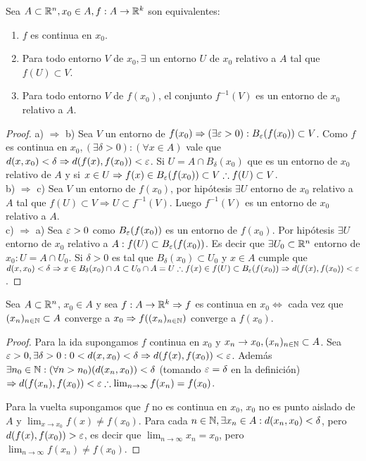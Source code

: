 \begin{prop}
  Sea $A \subset \mathbb{R}^n, x_0 \in A, f: A \to \mathbb{R}^k$ son equivalentes:
  \begin{enumerate}
    \item $f$ es continua en $x_0$.
    \item Para todo entorno $V$ de $x_0, \exists$ un entorno $U$ de $x_0$ relativo a $A$ tal que $f(U) \subset V$.
    \item Para todo entorno $V$ de $f(x_0)$, el conjunto $f^{-1}(V)$ es un entorno de $x_0$ relativo a $A$.
  \end{enumerate}

  \begin{proof}
    a) $\Rightarrow$ b) Sea $V$ un entorno de $f(x_0) \Rightarrow (\exists \varepsilon > 0) : B_{\varepsilon}(f(x_0)) \subset V$. Como $f$ es continua en $x_0, (\exists \delta > 0) : (\forall x \in A)$ vale que $d(x, x_0) < \delta \Rightarrow d(f(x), f(x_0)) < \varepsilon$. Si $U = A \cap B_{\delta}(x_0)$ que es un entorno de $x_0$ relativo de $A$ y si $x \in U \Rightarrow f(x) \in B_{\varepsilon}(f(x_0)) \subset V \therefore f(U) \subset V$. \\
    b) $\Rightarrow$ c) Sea $V$ un entorno de $f(x_0)$, por hipótesis $\exists U$ entorno de $x_0$ relativo a $A$ tal que $f(U) \subset V \Rightarrow U \subset f^{-1}(V)$. Luego $f^{-1}(V)$ es un entorno de $x_0$ relativo a $A$. \\
    c) $\Rightarrow$ a) Sea $\varepsilon > 0$ como $B_{\varepsilon}(f(x_0))$ es un entorno de $f(x_0)$. Por hipótesis $\exists U$ entorno de $x_0$ relativo a $A : f(U) \subset B_{\varepsilon}(f(x_0))$. Es decir que $\exists U_0 \subset \mathbb{R}^n$ entorno de $x_0 : U = A \cap U_0$. Si $\delta > 0$ es tal que $B_{\delta}(x_0) \subset U_0$ y $x \in A$ cumple que $d(x, x_0) < \delta \Rightarrow x \in B_{\delta}(x_0) \cap A \subset U_0 \cap A = U \therefore f(x) \in f(U) \subset B_{\varepsilon}(f(x_0))  \Rightarrow d(f(x), f(x_0)) < \varepsilon$.
  \end{proof}
\end{prop}

\begin{prop}
  Sea $A \subset \mathbb{R}^n$, $x_0 \in A$ y sea $f: A \to \mathbb{R}^k \Rightarrow f$ es continua en $x_0 \iff$ cada vez que $(x_n)_{n \in \mathbb{N}} \subset A$ converge a $x_0 \Rightarrow f((x_n)_{n \in \mathbb{N}})$ converge a $f(x_0)$.
  \begin{proof}
    Para la ida supongamos $f$ continua en $x_0$ y $x_n \to x_0, (x_n)_{n \in \mathbb{N}} \subset A$. Sea $\varepsilon > 0, \exists \delta > 0 : 0 < d(x, x_0) < \delta \Rightarrow d(f(x), f(x_0)) < \varepsilon$.
    Además $\exists n_0 \in \mathbb{N} : (\forall n > n_0)(d(x_n, x_0)) < \delta$ (tomando $\varepsilon = \delta$ en la definición) $\Rightarrow d(f(x_n), f(x_0)) < \varepsilon \therefore \lim_{n \to \infty} f(x_n) = f(x_0)$.

    Para la vuelta supongamos que $f$ no es continua en $x_0$, $x_0$ no es punto aislado de $A$ y $\lim_{x \to x_0} f(x) \neq f(x_0)$. Para cada $n \in \mathbb{N}, \exists x_n \in A : d(x_n, x_0) < \delta$, pero $d(f(x), f(x_0)) > \varepsilon$, es decir que $\lim_{n \to \infty} x_n = x_0$, pero $\lim_{n \to \infty} f(x_n) \neq f(x_0)$.
  \end{proof}
\end{prop}

